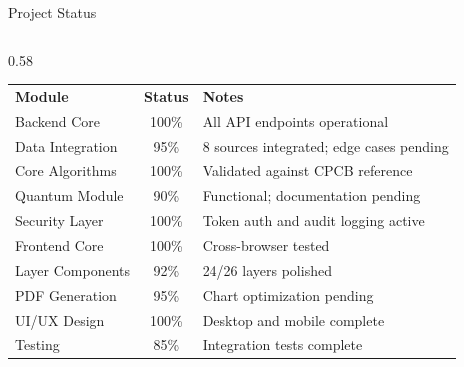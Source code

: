 \documentclass[aspectratio=169,10pt]{beamer}
\begin{document}
\begin{frame}{Project Status}
\begin{center}
\end{center}

\vspace{0.1cm}

\begin{columns}[T]
    \begin{column}{0.58\textwidth}
        \scriptsize
        \renewcommand{\arraystretch}{1.08}
        \begin{tabular}{p{2.6cm}cp{4.2cm}}
            \rowcolor{primaryblue!12}
            \textbf{Module} & \textbf{Status} & \textbf{Notes} \\
            Backend Core & 100\% & All API endpoints operational \\
            \rowcolor{softgray}
            Data Integration & 95\% & 8 sources integrated; edge cases pending \\
            Core Algorithms & 100\% & Validated against CPCB reference \\
            \rowcolor{softgray}
            Quantum Module & 90\% & Functional; documentation pending \\
            Security Layer & 100\% & Token auth and audit logging active \\
            \rowcolor{softgray}
            Frontend Core & 100\% & Cross-browser tested \\
            Layer Components & 92\% & 24/26 layers polished \\
            \rowcolor{softgray}
            PDF Generation & 95\% & Chart optimization pending \\
            UI/UX Design & 100\% & Desktop and mobile complete \\
            \rowcolor{softgray}
            Testing & 85\% & Integration tests complete \\
        \end{tabular}
    \end{column}


\end{columns}
\end{frame}
\end{document}
